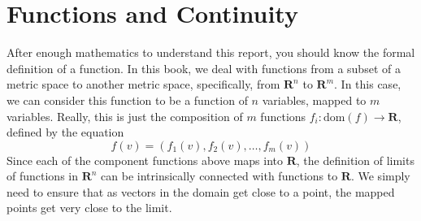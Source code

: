 \chapter{Functions and Continuity}

After enough mathematics to understand this report, you should know the formal definition of a function. In this book, we deal with functions from a subset of a metric space to another metric space, specifically, from $\mathbf{R}^n$ to $\mathbf{R}^m$. In this case, we can consider this function to be a function of $n$ variables, mapped to $m$ variables. Really, this is just the composition of $m$ functions $f_i: \text{dom}(f) \to \mathbf{R}$, defined by the equation
%
\[ f(v) = (f_1(v), f_2(v), \dots, f_m(v)) \]
%
Since each of the component functions above maps into $\mathbf{R}$, the definition of limits of functions in $\mathbf{R}^n$ can be intrinsically connected with functions to $\mathbf{R}$. We simply need to ensure that as vectors in the domain get close to a point, the mapped points get very close to the limit.

